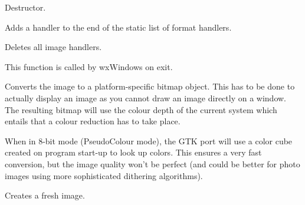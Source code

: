 

Destructor.

\label{wximageaddhandler}


Adds a handler to the end of the static list of format handlers.






Deletes all image handlers.

This function is called by wxWindows on exit.

\label{wximageconverttobitmap}


Converts the image to a platform-specific bitmap object. This has to be done
to actually display an image as you cannot draw an image directly on a window.
The resulting bitmap will use the colour depth of the current system which entails
that a colour reduction has to take place. 

When in 8-bit mode (PseudoColour mode), the GTK port will use a color cube created 
on program start-up to look up colors. This ensures a very fast conversion, but
the image quality won't be perfect (and could be better for photo images using more
sophisticated dithering algorithms).

\label{wximagecreate}


Creates a fresh image.




